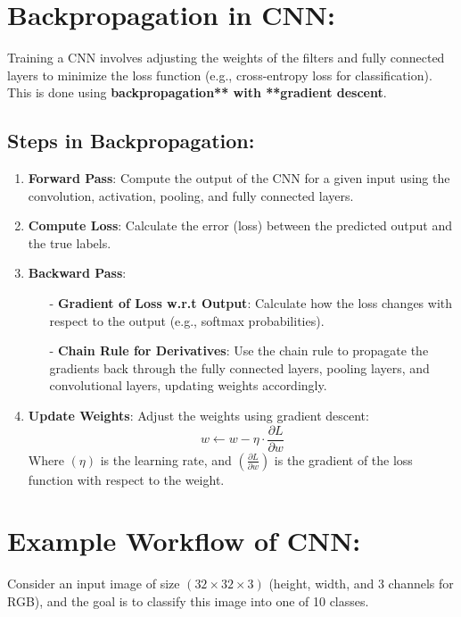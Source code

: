 \documentclass[10pt]{article}
\begin{document}
\section{ Backpropagation in CNN:}
Training a CNN involves adjusting the weights of the filters and fully connected layers to minimize the loss function (e.g., cross-entropy loss for classification). This is done using {\bf backpropagation** with **gradient descent}.

\subsection{Steps in Backpropagation:}

\begin{enumerate}
   \item {\bf Forward Pass}: Compute the output of the CNN for a given input using the convolution, activation, pooling, and fully connected layers.
      
   \item {\bf Compute Loss}: Calculate the error (loss) between the predicted output and the true labels.
   
   \item {\bf Backward Pass}:
   \begin{itemize}
      \item [-] {\bf Gradient of Loss w.r.t Output}: Calculate how the loss changes with respect to the output (e.g., softmax probabilities).
      \item [-] {\bf Chain Rule for Derivatives}: Use the chain rule to propagate the gradients back through the fully connected layers, pooling layers, and convolutional layers, updating weights accordingly.
   \end{itemize}
   
   \item {\bf Update Weights}: Adjust the weights using gradient descent:
      $$
      w \leftarrow w - \eta \cdot \frac{\partial L}{\partial w}
      $$
      Where $( \eta )$ is the learning rate, and $( \frac{\partial L}{\partial w} )$ is the gradient of the loss function with respect to the weight.
\end{enumerate}

\section{ Example Workflow of CNN:}
Consider an input image of size $( 32 \times 32 \times 3 )$ (height, width, and 3 channels for RGB), and the goal is to classify this image into one of 10 classes.
\end{document}
